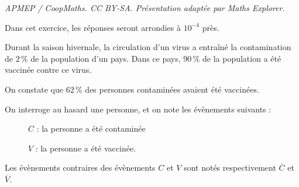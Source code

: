 \documentclass[10pt]{article}
\begin{document}
\noindent\textit{APMEP / CoopMaths. CC BY-SA. Présentation adaptée par Maths Explorer.}\par\medskip
\medskip

Dans cet exercice, les réponses seront arrondies à $10^{-4}$ près.

\bigskip

Durant la saison hivernale, la circulation d'un virus a entraîné la contamination de $2\,\%$ de la population d'un pays. Dans ce pays, $90\,\%$ de la population a été vaccinée contre ce virus.

On constate que $62\,\%$ des personnes contaminées avaient été vaccinées.


\bigskip

On interroge au hasard une personne, et on note les évènements suivants :

\begin{description}
\item[ ] $C$ : \og la personne a été contaminée\fg{}
\item[ ] $V$ : \og la personne a été vaccinée\fg{}.
\end{description}

Les évènements contraires des évènements $C$ et $V$ sont notés respectivement $\overline{C}$ et $\overline{V}$.

\medskip
\end{document}
